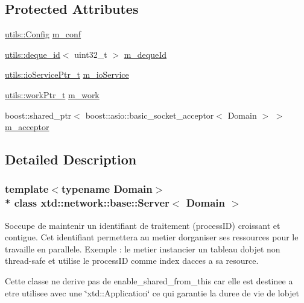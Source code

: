 \subsection*{Protected Attributes}
\begin{DoxyCompactItemize}
\item 
\hyperlink{classxtd_1_1network_1_1utils_1_1Config}{utils\+::\+Config} \hyperlink{classxtd_1_1network_1_1base_1_1Server_a5465aab6a4cbdaa664eeaf9eef6da5ac}{m\+\_\+conf}
\item 
\hyperlink{classxtd_1_1network_1_1utils_1_1deque__id}{utils\+::deque\+\_\+id}$<$ uint32\+\_\+t $>$ \hyperlink{classxtd_1_1network_1_1base_1_1Server_a5092eab162e1e793aaeac42368c5c06f}{m\+\_\+deque\+Id}
\item 
\hyperlink{namespacextd_1_1network_1_1utils_a67dfba91438896976d636d5aea36c848}{utils\+::io\+Service\+Ptr\+\_\+t} \hyperlink{classxtd_1_1network_1_1base_1_1Server_a2b67486dfc934466300fa48295f94b46}{m\+\_\+io\+Service}
\item 
\hyperlink{namespacextd_1_1network_1_1utils_a9e0bae7b0da2b42ca8930a927f3a7c4d}{utils\+::work\+Ptr\+\_\+t} \hyperlink{classxtd_1_1network_1_1base_1_1Server_ad762843698e4e7b4e70974c2daab0932}{m\+\_\+work}
\item 
boost\+::shared\+\_\+ptr$<$ boost\+::asio\+::basic\+\_\+socket\+\_\+acceptor$<$ Domain $>$ $>$ \hyperlink{classxtd_1_1network_1_1base_1_1Server_a03e4c0a664c471e756217b20b2209980}{m\+\_\+acceptor}
\end{DoxyCompactItemize}


\subsection{Detailed Description}
\subsubsection*{template$<$typename Domain$>$\\*
class xtd\+::network\+::base\+::\+Server$<$ Domain $>$}


\begin{DoxyEnumerate}
\item S\textquotesingle{}occupe de maintenir un identifiant de traitement (process\+ID) croissant et contigue. Cet identifiant permettera au metier d\textquotesingle{}organiser ses ressources pour le travaille en parallele. Exemple \+: le metier instancier un tableau d\textquotesingle{}objet non thread-\/safe et utilise le process\+ID comme index d\textquotesingle{}acces a sa resource.
\item Cette classe ne derive pas de enable\+\_\+shared\+\_\+from\+\_\+this car elle est destinee a etre utilisee avec une \char`\"{}xtd\+::\+Application\char`\"{} ce qui garantie la duree de vie de l\textquotesingle{}objet 
\end{DoxyEnumerate}

